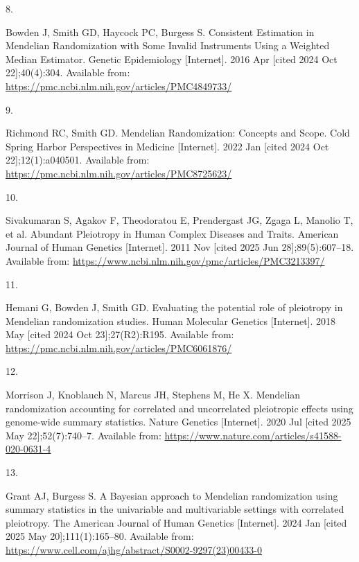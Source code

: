 \documentclass[
]{article}
\newlength{\cslhangindent}
\newlength{\csllabelwidth}
\newenvironment{CSLReferences}[2] %
 {\begin{list}{}{%
  \setlength{\itemindent}{0pt}
  \setlength{\leftmargin}{0pt}
  \setlength{\parsep}{0pt}
  \ifodd #1
   \setlength{\leftmargin}{\cslhangindent}
   \setlength{\itemindent}{-1\cslhangindent}
  \fi
  \setlength{\itemsep}{#2\baselineskip}}}
 {\end{list}}
\newcommand{\CSLLeftMargin}[1]{\parbox[t]{\csllabelwidth}{\strut#1\strut}}
\newcommand{\CSLRightInline}[1]{\parbox[t]{\linewidth - \csllabelwidth}{\strut#1\strut}}
\begin{document}
\begin{CSLReferences}{0}{1}
\CSLLeftMargin{8. }%
\CSLRightInline{Bowden J, Smith GD, Haycock PC, Burgess S. Consistent {Estimation} in {Mendelian} {Randomization} with {Some} {Invalid} {Instruments} {Using} a {Weighted} {Median} {Estimator}. Genetic Epidemiology {[}Internet{]}. 2016 Apr {[}cited 2024 Oct 22{]};40(4):304. Available from: \url{https://pmc.ncbi.nlm.nih.gov/articles/PMC4849733/}}

\CSLLeftMargin{9. }%
\CSLRightInline{Richmond RC, Smith GD. Mendelian {Randomization}: {Concepts} and {Scope}. Cold Spring Harbor Perspectives in Medicine {[}Internet{]}. 2022 Jan {[}cited 2024 Oct 22{]};12(1):a040501. Available from: \url{https://pmc.ncbi.nlm.nih.gov/articles/PMC8725623/}}

\CSLLeftMargin{10. }%
\CSLRightInline{Sivakumaran S, Agakov F, Theodoratou E, Prendergast JG, Zgaga L, Manolio T, et al. Abundant {Pleiotropy} in {Human} {Complex} {Diseases} and {Traits}. American Journal of Human Genetics {[}Internet{]}. 2011 Nov {[}cited 2025 Jun 28{]};89(5):607--18. Available from: \url{https://www.ncbi.nlm.nih.gov/pmc/articles/PMC3213397/}}

\CSLLeftMargin{11. }%
\CSLRightInline{Hemani G, Bowden J, Smith GD. Evaluating the potential role of pleiotropy in {Mendelian} randomization studies. Human Molecular Genetics {[}Internet{]}. 2018 May {[}cited 2024 Oct 23{]};27(R2):R195. Available from: \url{https://pmc.ncbi.nlm.nih.gov/articles/PMC6061876/}}

\CSLLeftMargin{12. }%
\CSLRightInline{Morrison J, Knoblauch N, Marcus JH, Stephens M, He X. Mendelian randomization accounting for correlated and uncorrelated pleiotropic effects using genome-wide summary statistics. Nature Genetics {[}Internet{]}. 2020 Jul {[}cited 2025 May 22{]};52(7):740--7. Available from: \url{https://www.nature.com/articles/s41588-020-0631-4}}

\CSLLeftMargin{13. }%
\CSLRightInline{Grant AJ, Burgess S. A {Bayesian} approach to {Mendelian} randomization using summary statistics in the univariable and multivariable settings with correlated pleiotropy. The American Journal of Human Genetics {[}Internet{]}. 2024 Jan {[}cited 2025 May 20{]};111(1):165--80. Available from: \url{https://www.cell.com/ajhg/abstract/S0002-9297(23)00433-0}}


\end{CSLReferences}
\end{document}
